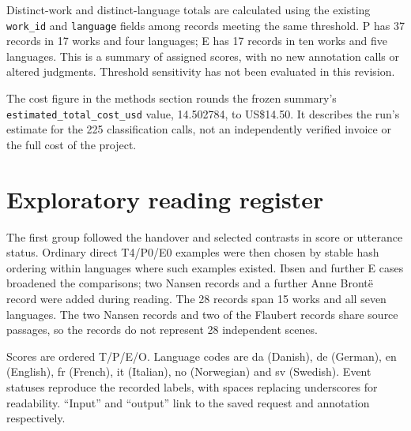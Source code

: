 Distinct-work and distinct-language totals are calculated using the existing \texttt{work\_id} and \texttt{language} fields among records meeting the same threshold. P has 37 records in 17 works and four languages; E has 17 records in ten works and five languages. This is a summary of assigned scores, with no new annotation calls or altered judgments. Threshold sensitivity has not been evaluated in this revision.

The cost figure in the methods section rounds the frozen summary's \texttt{estimated\_total\_cost\_usd} value, 14.502784, to US\$14.50. It describes the run's estimate for the 225 classification calls, not an independently verified invoice or the full cost of the project.

\section{Exploratory reading register}

The first group followed the handover and selected contrasts in score or utterance status. Ordinary direct T4/P0/E0 examples were then chosen by stable hash ordering within languages where such examples existed. Ibsen and further E cases broadened the comparisons; two Nansen records and a further Anne Bront\"e record were added during reading. The 28 records span 15 works and all seven languages. The two Nansen records and two of the Flaubert records share source passages, so the records do not represent 28 independent scenes.

Scores are ordered T/P/E/O. Language codes are da (Danish), de (German), en (English), fr (French), it (Italian), no (Norwegian) and sv (Swedish). Event statuses reproduce the recorded labels, with spaces replacing underscores for readability. ``Input'' and ``output'' link to the saved request and annotation respectively.

